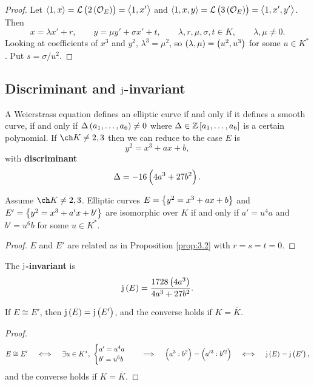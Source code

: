 \begin{proof}
Let $ \abr{1, x} = \LLL\br{2\br{\OOO_E}} = \abr{1, x'} $ and $ \abr{1, x, y} = \LLL\br{3\br{\OOO_E}} = \abr{1, x', y'} $. Then
$$ x = \lambda x' + r, \qquad y = \mu y' + \sigma x' + t, \qquad \lambda, r, \mu, \sigma, t \in K, \qquad \lambda, \mu \ne 0. $$
Looking at coefficients of $ x^3 $ and $ y^2 $, $ \lambda^3 = \mu^2 $, so $ \br{\lambda, \mu} = \br{u^2, u^3} $ for some $ u \in K^* $. Put $ s = \sigma / u^2 $.
\end{proof}

\pagebreak

\subsection{Discriminant and \texorpdfstring{$ \mathrm{j} $}{j}-invariant}

A Weierstrass equation defines an elliptic curve if and only if it defines a smooth curve, if and only if $ \Delta\br{a_1, \dots, a_6} \ne 0 $ where $ \Delta \in \ZZ\sbr{a_1, \dots, a_6} $ is a certain polynomial. If $ \ch K \ne 2, 3 $ then we can reduce to the case $ E $ is
$$ y^2 = x^3 + ax + b, $$
with \textbf{discriminant}
$$ \Delta = -16\br{4a^3 + 27b^2}. $$

\begin{corollary}
Assume $ \ch K \ne 2, 3 $. Elliptic curves $ E = \cbr{y^2 = x^3 + ax + b} $ and $ E' = \cbr{y^2 = x^3 + a'x + b'} $ are isomorphic over $ K $ if and only if $ a' = u^4a $ and $ b' = u^6b $ for some $ u \in K^* $.
\end{corollary}

\begin{proof}
$ E $ and $ E' $ are related as in Proposition \ref{prop:3.2} with $ r = s = t = 0 $.
\end{proof}

\begin{definition*}
The \textbf{$ \mathrm{j} $-invariant} is
$$ \j\br{E} = \dfrac{1728\br{4a^3}}{4a^3 + 27b^2}. $$
\end{definition*}

\begin{corollary}
If $ E \cong E' $, then $ \j\br{E} = \j\br{E'} $, and the converse holds if $ K = \overline{K} $.
\end{corollary}

\begin{proof}
$$ E \cong E' \quad \iff \quad \exists u \in K^*, \
\begin{cases}
a' = u^4a \\
b' = u^6b
\end{cases}
\quad \implies \quad \br{a^3 : b^2} = \br{a'^3 : b'^2} \quad \iff \quad \j\br{E} = \j\br{E'}, $$
and the converse holds if $ K = \overline{K} $.
\end{proof}

